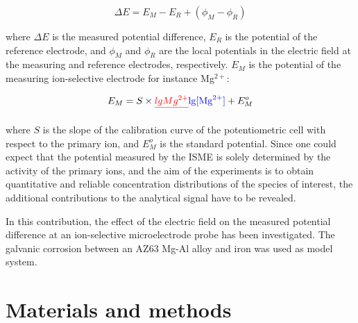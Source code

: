 \documentclass[3p]{elsarticle}
\providecommand{\DIFadd}[1]{{\protect\color{blue}#1}} %
\providecommand{\DIFdel}[1]{{\protect\color{red}\sout{#1}}}                      %
\providecommand{\DIFaddbegin}{} %
\providecommand{\DIFaddend}{} %
\providecommand{\DIFdelbegin}{} %
\providecommand{\DIFdelend}{} %
\begin{document}
\begin{equation}
\Delta E=E_M-E_R + (\phi_M - \phi_R)
\label{eq:potential}
\end{equation}

where $\Delta E$ is the measured potential difference, $E_R$ is the potential of the reference electrode, and $\phi_M$ and $\phi_R$ are the local potentials in the electric field at the measuring and reference electrodes, respectively. $E_M$ is the potential of the measuring ion-selective electrode for instance Mg$^{2+}$:

\begin{equation}
E_M = S \times \DIFdelbegin \DIFdel{lg}%
\DIFdel{Mg^{2+}}%
\DIFdelend \DIFaddbegin \DIFadd{\lg[\textrm{Mg}^{2+}] }\DIFaddend + E_M^o
\label{eq:measuring}
\end{equation}

where $S$ is the slope of the calibration curve of the potentiometric cell with respect to the primary ion, and $E_M^o$ is the standard potential.
Since one could expect that the potential measured by the ISME is solely determined by the activity of the primary ions, and the aim of the experiments is to obtain quantitative and reliable concentration distributions of the species of interest, the additional contributions to the analytical signal have to be revealed.

In this contribution, the effect of the electric field on the measured potential difference at an ion-selective microelectrode probe has been investigated. The galvanic corrosion between an AZ63 Mg-Al alloy and iron was used as model system.

\section{Materials and methods}
\end{document}
